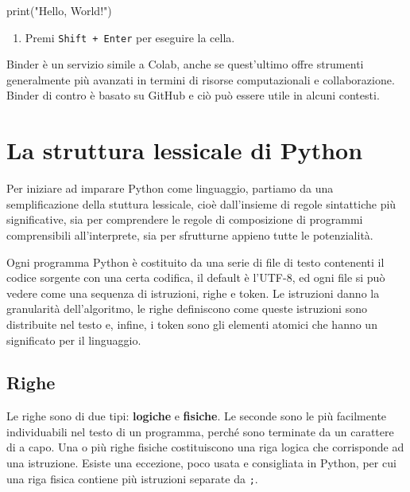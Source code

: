 \documentclass[
  letterpaper,
]{scrbook}
\newenvironment{Shaded}{\begin{snugshade}}{\end{snugshade}}
\newcommand{\BuiltInTok}[1]{\textcolor[rgb]{0.00,0.23,0.31}{#1}}
\newcommand{\NormalTok}[1]{\textcolor[rgb]{0.00,0.23,0.31}{#1}}
\newcommand{\StringTok}[1]{\textcolor[rgb]{0.13,0.47,0.30}{#1}}
\providecommand{\tightlist}{%
  \setlength{\itemsep}{0pt}\setlength{\parskip}{0pt}}\usepackage{longtable,booktabs,array}
\begin{document}
\begin{Shaded}
\begin{Highlighting}[]
\BuiltInTok{print}\NormalTok{(}\StringTok{"Hello, World!"}\NormalTok{)}
\end{Highlighting}
\end{Shaded}

\begin{enumerate}
\def\labelenumi{\arabic{enumi}.}
\setcounter{enumi}{5}
\tightlist
\item
  Premi \texttt{Shift\ +\ Enter} per eseguire la cella.
\end{enumerate}

Binder è un servizio simile a Colab, anche se quest'ultimo offre
strumenti generalmente più avanzati in termini di risorse computazionali
e collaborazione. Binder di contro è basato su GitHub e ciò può essere
utile in alcuni contesti.

\chapter{La struttura lessicale di
Python}\label{la-struttura-lessicale-di-python}

Per iniziare ad imparare Python come linguaggio, partiamo da una
semplificazione della stuttura lessicale, cioè dall'insieme di regole
sintattiche più significative, sia per comprendere le regole di
composizione di programmi comprensibili all'interprete, sia per
sfrutturne appieno tutte le potenzialità.

Ogni programma Python è costituito da una serie di file di testo
contenenti il codice sorgente con una certa codifica, il default è
l'UTF-8, ed ogni file si può vedere come una sequenza di istruzioni,
righe e token. Le istruzioni danno la granularità dell'algoritmo, le
righe definiscono come queste istruzioni sono distribuite nel testo e,
infine, i token sono gli elementi atomici che hanno un significato per
il linguaggio.

\section{Righe}\label{righe}

Le righe sono di due tipi: \textbf{logiche} e \textbf{fisiche}. Le
seconde sono le più facilmente individuabili nel testo di un programma,
perché sono terminate da un carattere di a capo. Una o più righe fisiche
costituiscono una riga logica che corrisponde ad una istruzione. Esiste
una eccezione, poco usata e consigliata in Python, per cui una riga
fisica contiene più istruzioni separate da \texttt{;}.
\end{document}
